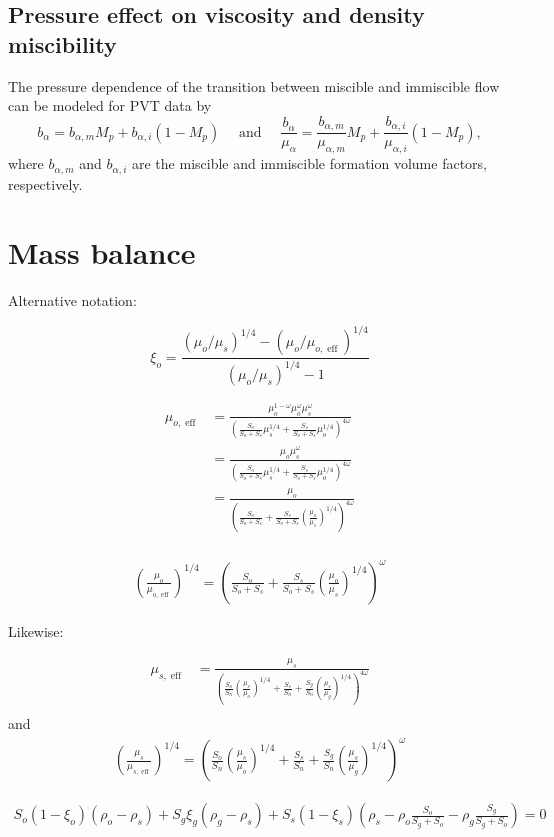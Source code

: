 \documentclass[11pt, a4paper]{article}
\DeclareMathOperator{\eff}{eff}
\begin{document}
\subsection*{Pressure effect on viscosity and density miscibility}

The pressure dependence of the transition between miscible and immiscible flow can be modeled for
PVT data by
\begin{equation*}
  b_\alpha = b_{\alpha,m} M_p + b_{\alpha,i}(1-M_p) \quad  \text{ and } \quad
  \frac{b_\alpha}{\mu_\alpha} = \frac{b_{\alpha,m}}{\mu_{\alpha,m}} M_p + \frac{b_{\alpha,i}}{\mu_{\alpha,i}}(1-M_p),
\end{equation*}
where $b_{\alpha,m}$ and $b_{\alpha,i}$ are the miscible and immiscible formation volume factors,
respectively. 


\section{Mass balance}

Alternative notation:

\begin{equation*}
  \xi_o = \frac{(\mu_o/\mu_s)^{1/4} - (\mu_o/\mu_{o,\eff})^{1/4}}{(\mu_o/\mu_s)^{1/4} - 1}
\end{equation*}

\begin{align*}
  \mu_{o,\eff}
  & = \frac{\mu_o^{1-\omega}\mu_o^\omega\mu_s^\omega}{\left(\frac{S_o}{S_o + S_s}\mu_s^{1/4} + \frac{S_s}{S_o + S_s}\mu_o^{1/4}\right)^{4\omega}} \\
  & = \frac{\mu_o\mu_s^\omega}{\left(\frac{S_o}{S_o + S_s}\mu_s^{1/4} + \frac{S_s}{S_o + S_s}\mu_o^{1/4}\right)^{4\omega}} \\
  & = \frac{\mu_o}{\left(\frac{S_o}{S_o + S_s} + \frac{S_s}{S_o + S_s}\left(\frac{\mu_o}{\mu_s}\right)^{1/4}\right)^{4\omega}} \\
\end{align*}

\begin{align*}
  \left(\frac{\mu_o}{\mu_{o,\eff}}\right)^{1/4} = \left(\frac{S_o}{S_o + S_s} + \frac{S_s}{S_o + S_s}\left(\frac{\mu_o}{\mu_s}\right)^{1/4}\right)^{\omega}
\end{align*}

Likewise:

\begin{align*}
  \mu_{s,\eff}
  & = \frac{\mu_s}{\left(\frac{S_o}{S_n} \left(\frac{\mu_s}{\mu_o}\right)^{1/4}+ \frac{S_s}{S_n} + \frac{S_g}{S_n}\left(\frac{\mu_s}{\mu_g}\right)^{1/4}\right)^{4\omega}} \\
\end{align*}
and
\begin{align*}
  \left(\frac{\mu_s}{\mu_{s,\eff}}\right)^{1/4} = \left(\frac{S_o}{S_n} \left(\frac{\mu_s}{\mu_o}\right)^{1/4}+ \frac{S_s}{S_n} + \frac{S_g}{S_n}\left(\frac{\mu_s}{\mu_g}\right)^{1/4}\right)^{\omega}
\end{align*}




\begin{align*}
  S_o(1-\xi_o)(\rho_o - \rho_s) + S_g\xi_g(\rho_g - \rho_s) + S_s(1-\xi_s)\left(\rho_s - \rho_o \frac{S_o}{S_g + S_o} - \rho_g \frac{S_g}{S_g + S_o}\right) = 0
\end{align*}

\begin{small}
  
\end{small}
\end{document}

